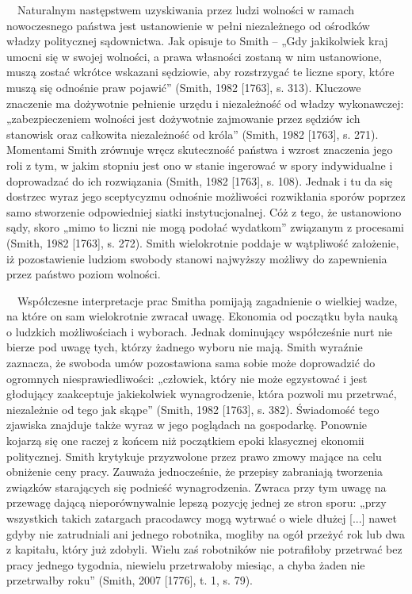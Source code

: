 \documentclass[a4paper]{article}
\begin{document}
 \ \ Naturalnym następstwem uzyskiwania przez ludzi wolności w ramach nowoczesnego państwa jest ustanowienie w pełni
niezależnego od ośrodków władzy politycznej sądownictwa. Jak opisuje to Smith – „Gdy jakikolwiek kraj umocni się w
swojej wolności, a prawa własności zostaną w nim ustanowione, muszą zostać wkrótce wskazani sędziowie, aby rozstrzygać
te liczne spory, które muszą się odnośnie praw pojawić” \label{ref:RNDkH7t6CSI0T}(Smith, 1982 [1763], s. 313). Kluczowe
znaczenie ma dożywotnie pełnienie urzędu i niezależność od władzy wykonawczej: „zabezpieczeniem wolności jest
dożywotnie zajmowanie przez sędziów ich stanowisk oraz całkowita niezależność od króla”
\label{ref:RNDQY5dE7difr}(Smith, 1982 [1763], s. 271). Momentami Smith zrównuje wręcz skuteczność państwa i wzrost
znaczenia jego roli z tym, w jakim stopniu jest ono w stanie ingerować w spory indywidualne i doprowadzać do ich
rozwiązania \label{ref:RNDK9nA5CA9CU}(Smith, 1982 [1763], s. 108). Jednak i tu da się dostrzec wyraz jego sceptycyzmu
odnośnie możliwości rozwikłania sporów poprzez samo stworzenie odpowiedniej siatki instytucjonalnej. Cóż z tego, że
ustanowiono sądy, skoro „mimo to liczni nie mogą podołać wydatkom” związanym z procesami
\label{ref:RNDfgTZLS43gg}(Smith, 1982 [1763], s. 272). Smith wielokrotnie poddaje w wątpliwość założenie, iż
pozostawienie ludziom swobody stanowi najwyższy możliwy do zapewnienia przez państwo poziom wolności.

\ \ Współczesne interpretacje prac Smitha pomijają zagadnienie o wielkiej wadze, na które on sam wielokrotnie zwracał
uwagę. Ekonomia od początku była nauką o ludzkich możliwościach i wyborach. Jednak dominujący współcześnie nurt nie
bierze pod uwagę tych, którzy żadnego wyboru nie mają. Smith wyraźnie zaznacza, że swoboda umów pozostawiona sama sobie
może doprowadzić do ogromnych niesprawiedliwości: „człowiek, który nie może egzystować i jest głodujący zaakceptuje
jakiekolwiek wynagrodzenie, która pozwoli mu przetrwać, niezależnie od tego jak skąpe” \label{ref:RNDIiGLDa4lxS}(Smith,
1982 [1763], s. 382). Świadomość tego zjawiska znajduje także wyraz w jego poglądach na gospodarkę. Ponownie kojarzą
się one raczej z końcem niż początkiem epoki klasycznej ekonomii politycznej. Smith krytykuje przyzwolone przez prawo
zmowy mające na celu obniżenie ceny pracy. Zauważa jednocześnie, że przepisy zabraniają tworzenia związków starających
się podnieść wynagrodzenia. Zwraca przy tym uwagę na przewagę dającą nieporównywalnie lepszą pozycję jednej ze stron
sporu: „przy wszystkich takich zatargach pracodawcy mogą wytrwać o wiele dłużej [...] nawet gdyby nie zatrudniali ani
jednego robotnika, mogliby na ogół przeżyć rok lub dwa z kapitału, który już zdobyli. Wielu zaś robotników nie
potrafiłoby przetrwać bez pracy jednego tygodnia, niewielu przetrwałoby miesiąc, a chyba żaden nie przetrwałby roku”
\label{ref:RND1j5HGSGWhu}(Smith, 2007 [1776], t. 1, s. 79).
\end{document}
